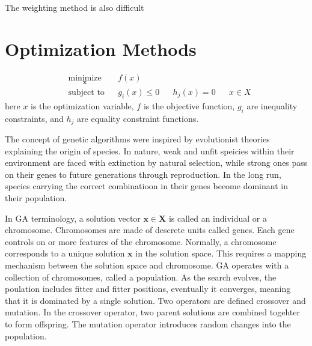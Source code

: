 The weighting method is also difficult

\section{Optimization Methods}

\begin{equation}
  \begin{aligned}
  & \underset{\bm{x}}{\text{minimize}}
        & &  f(x)\\
  & \text{subject to}
        & & g_i(x) \leq 0
        & & h_j(x) = 0
        & & x \in X
  \end{aligned}
\end{equation}
here $x$ is the optimization variable, $f$ is the objective function, $g_i$ are inequality constraints, and $h_j$ are equality constraint functions.

The concept of genetic algorithms were inspired by evolutionist theories explaining the origin of species\cite{holland1992_ga}.  In nature, weak and unfit speicies within their environment are faced with extinction by natural selection, while strong ones pass on their genes to future generations through reproduction.  In the long run, species carrying the correct combinatioon in their
    genes become dominant in their population.

In GA terminology, a solution vector $\bm{x}\in\bm{X}$ is called an individual or a chromosome.  Chromosomes are made of descrete units called genes.  Each gene controls on or more features of the chromosome.  Normally, a chromosome corresponds to a unique solution $\bm{x}$ in the solution space.  This requires a mapping mechanism between the solution space and chromosome.  GA operates with a collection of chromosomes, called a population.  As the search evolves, the poulation includes fitter and fitter positions, eventually it converges, meaning that it is dominated by a single solution.  Two operators are defined crossover and mutation.  In the crossover operator, two parent solutions are combined togehter to form offspring.  The mutation operator introduces random changes into the population.

